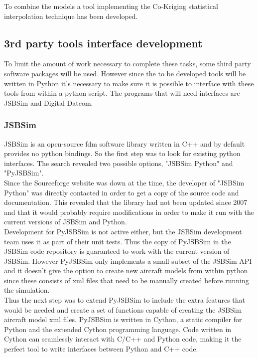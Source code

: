 To combine the models a tool implementing the Co-Kriging statistical interpolation technique has been developed.

\subsection{3rd party tools interface development}
To limit the amount of work necessary to complete these tasks, some third party software packages will be used. However since the to be developed tools will be written in Python it's necessary to make sure it is possible to interface with these tools from within a python script. The programs that will need interfaces are JSBSim and Digital Datcom.

\subsubsection{JSBSim}
JSBSim is an open-source \gls{fdm} software library written in C++ and by default provides no python bindings. So the first step was to look for existing python interfaces. The search revealed two possible options, "JSBSim Python" and "PyJSBSim". \\

Since the Sourceforge website was down at the time, the developer of "JSBSim Python" was directly contacted in order to get a copy of the source code and documentation. This revealed that the library had not been updated since 2007 and that it would probably require modifications in order to make it run with the current versions of JSBSim and Python. \\

Development for PyJSBSim is not active either, but the JSBSim development team uses it as part of their unit tests. Thus the copy of PyJSBSim in the JSBSim code repository is guaranteed to work with the current version of JSBSim. However PyJSBSim only implements a small subset of the JSBSim API and it doesn't give the option to create new aircraft models from within python since these consists of \gls{xml} files that need to be manually created before running the simulation. \\

Thus the next step was to extend PyJSBSim to include the extra features that would be needed and create a set of functions capable of creating the JSBSim aircraft model \gls{xml} files. PyJSBSim is written in Cython, a static compiler for Python and the extended Cython programming language. Code written in Cython can seamlessly interact with C/C++ and Python code, making it the perfect tool to write interfaces between Python and C++ code. \\

